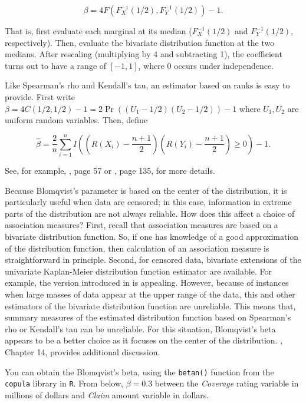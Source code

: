 \documentclass[]{book}
\theoremstyle{definition}
\theoremstyle{definition}
\theoremstyle{definition}
\theoremstyle{remark}
\begin{document}
\begin{equation*}
\beta = 4F\left(F^{-1}_X(1/2),F^{-1}_Y(1/2) \right) - 1.
\end{equation*}

That is, first evaluate each marginal at its median (\(F^{-1}_X(1/2)\)
and \(F^{-1}_Y(1/2)\), respectively). Then, evaluate the bivariate
distribution function at the two medians. After rescaling (multiplying
by 4 and subtracting 1), the coefficient turns out to have a range of
\([-1,1]\), where 0 occurs under independence.

Like Spearman's rho and Kendall's tau, an estimator based on ranks is
easy to provide. First write
\(\beta = 4C(1/2,1/2)-1 = 2\Pr((U_1-1/2)(U_2-1/2))-1\) where
\(U_1, U_2\) are uniform random variables. Then, define

\begin{equation*}
\hat{\beta} = \frac{2}{n} \sum_{i=1}^n I\left( (R(X_{i})-\frac{n+1}{2})(R(Y_{i})-\frac{n+1}{2}) \ge 0 \right)-1 .
\end{equation*}

See, for example, \citep{joe2014dependence}, page 57 or
\citep{hougaard2000analysis}, page 135, for more details.

Because Blomqvist's parameter is based on the center of the
distribution, it is particularly useful when data are censored; in this
case, information in extreme parts of the distribution are not always
reliable. How does this affect a choice of association measures? First,
recall that association measures are based on a bivariate distribution
function. So, if one has knowledge of a good approximation of the
distribution function, then calculation of an association measure is
straightforward in principle. Second, for censored data, bivariate
extensions of the univariate Kaplan-Meier distribution function
estimator are available. For example, the version introduced in
\citep{dabrowska1988kaplan} is appealing. However, because of instances
when large masses of data appear at the upper range of the data, this
and other estimators of the bivariate distribution function are
unreliable. This means that, summary measures of the estimated
distribution function based on Spearman's rho or Kendall's tau can be
unreliable. For this situation, Blomqvist's beta appears to be a better
choice as it focuses on the center of the distribution.
\citep{hougaard2000analysis}, Chapter 14, provides additional
discussion.

You can obtain the Blomqvist's beta, using the \texttt{betan()} function
from the \texttt{copula} library in \texttt{R}. From below,
\(\beta=0.3\) between the \emph{Coverage} rating variable in millions of
dollars and \emph{Claim} amount variable in dollars.
\end{document}
